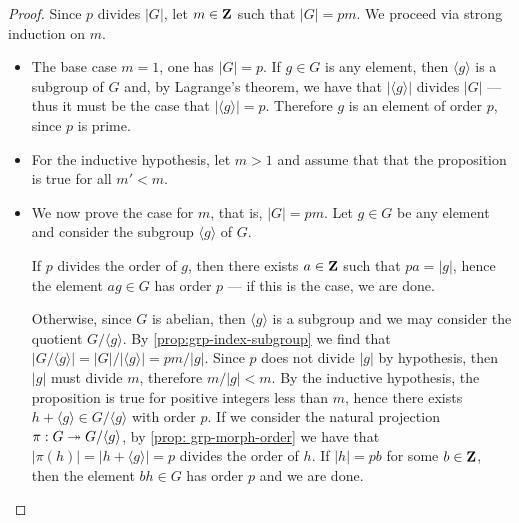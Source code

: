 \begin{proof}
    Since \(p\) divides \(|G|\), let \(m \in \mathbf{Z}\) such that \(|G| = p m\). We
    proceed via strong induction on \(m\).
    \begin{itemize}\setlength\itemsep{0em}
        \item The base case \(m = 1\), one has \(|G| = p\). If \(g \in G\) is any
              element, then \(\langle g \rangle\) is a subgroup of \(G\) and, by Lagrange's
              theorem, we have that \(|\langle g \rangle|\) divides \(|G|\) --- thus it must
              be the case that \(|\langle g \rangle| = p\). Therefore \(g\) is an element of
              order \(p\), since \(p\) is prime.
        \item For the inductive hypothesis, let \(m > 1\) and assume that that the
              proposition is true for all \(m' < m\).
        \item We now prove the case for \(m\), that is, \(|G| = p m\). Let \(g \in G\)
              be any element and consider the subgroup \(\langle g \rangle\) of
              \(G\).

              If \(p\) divides the order of \(g\), then there exists \(a
              \in \mathbf{Z}\) such that \(p a = |g|\), hence the element \(a g \in G\) has order
              \(p\) --- if this is the case, we are done.

              Otherwise, since \(G\) is abelian, then \(\langle g \rangle\) is a subgroup
              and we may consider the quotient \(G/{\langle g \rangle}\). By
              \cref{prop:grp-index-subgroup} we find that
              \(|G/{\langle g \rangle}| = |G|/{|\langle g \rangle|} = p m / |g|\). Since
              \(p\) does not divide \(|g|\) by hypothesis, then \(|g|\) must divide \(m\),
              therefore \(m/|g| < m\). By the inductive hypothesis, the proposition is true
              for positive integers less than \(m\), hence there exists
              \(h + \langle g \rangle \in G/{\langle g \rangle}\) with order \(p\). If we
              consider the natural projection \(\pi: G \twoheadrightarrow G/{\langle g \rangle}\), by
              \cref{prop: grp-morph-order} we have that
              \(|\pi(h)| = |h + \langle g \rangle| = p\) divides the order of \(h\). If
              \(|h| = p b\) for some \(b \in \mathbf{Z}\), then the element \(b h \in G\) has order
              \(p\) and we are done.
    \end{itemize}
\end{proof}


